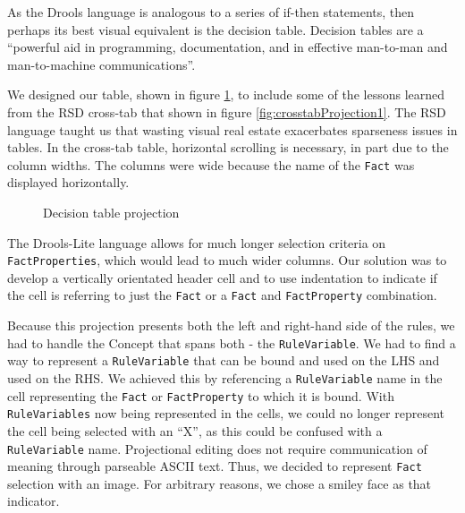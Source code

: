 As the Drools language is analogous to a series of if-then statements, then perhaps its best visual equivalent is the decision table.
Decision tables are a ``powerful aid in programming, documentation, and in effective man-to-man and man-to-machine communications''\cite{pooch1974translation}.

We designed our table, shown in figure \ref{fig:decisionTableProjection}, to include some of the lessons learned from the RSD cross-tab that shown in figure \ref{fig:crosstabProjection1}.
The RSD language taught us that wasting visual real estate exacerbates sparseness issues in tables.
In the cross-tab table, horizontal scrolling is necessary, in part due to the column widths.
The columns were wide because the name of the \texttt{Fact} was displayed horizontally.

\begin{figure}[h]
    \centering
    \caption{Decision table projection}
    \label{fig:decisionTableProjection}
\end{figure}

The Drools-Lite language allows for much longer selection criteria on \texttt{FactProperties}, which would lead to much wider columns.
Our solution was to develop a vertically orientated header cell and to use indentation to indicate if the cell is referring to just the \texttt{Fact} or a \texttt{Fact} and \texttt{FactProperty} combination.

Because this projection presents both the left and right-hand side of the rules, we had to handle the Concept that spans both - the \texttt{RuleVariable}.
We had to find a way to represent a \texttt{RuleVariable} that can be bound and used on the LHS and used on the RHS.
We achieved this by referencing a \texttt{RuleVariable} name in the cell representing the \texttt{Fact} or \texttt{FactProperty} to which it is bound.
With \texttt{RuleVariables} now being represented in the cells, we could no longer represent the cell being selected with an ``X'', as this could be confused with a \texttt{RuleVariable} name.
Projectional editing does not require communication of meaning through parseable ASCII text.
Thus, we decided to represent \texttt{Fact} selection with an image.
For arbitrary reasons, we chose a smiley face as that indicator.

